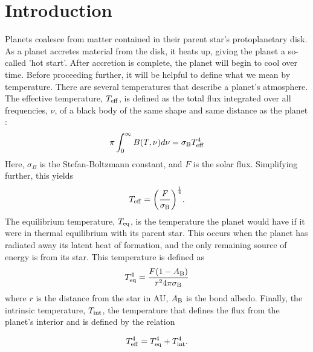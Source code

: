 \documentclass[11pt]{ucscthesisbs}
\begin{document}

\chapter{Introduction}
Planets coalesce from matter contained in their parent star's protoplanetary disk. As a planet accretes material from the disk, it heats up, giving the planet a so-called 'hot start'. After accretion is complete, the planet will begin to cool over time. Before proceeding further, it will be helpful to define what we mean by temperature. There are several temperatures that describe a planet's atmosphere. The effective temperature, $T_{\rm eff}$, is defined as the total flux integrated over all frequencies, $\nu$, of a black body of the same shape and same distance as the planet \citep{seager_2010}:
\begin{equation}
    \pi \int_{0}^{\infty} B(T, \nu) d\nu = \sigma_{\rm B}T_{\rm eff}^{4}
  \label{eq:effective_temp_integral}
\end{equation}  
Here, $\sigma_{B}$ is the Stefan-Boltzmann constant, and $F$ is the solar flux. Simplifying further, this yields
\begin{equation}
    T_{\rm eff} = \bigg(\frac{F}{\sigma_{\rm B}}\bigg)^{\frac{1}{4}}.
  \label{eq:effective_temp}
\end{equation}
The equilibrium temperature, $T_{\rm eq}$, is the temperature the planet would have if it were in thermal equilibrium with its parent star. This occurs when the planet has radiated away its latent heat of formation, and the only remaining source of energy is from its star. This temperature is defined as
\begin{equation}
    T_{\rm eq}^4 = \frac{F(1-A_{\rm B})}{r^{2} 4 \pi \sigma_{\rm B}}
  \label{eq:equilibrium_temp}
\end{equation} 
where $r$ is the distance from the star in AU, $A_{\rm B}$ is the bond albedo. Finally, the intrinsic temperature, $T_{\rm int}$, the temperature that defines the flux from the planet's interior and is defined by the relation

\begin{equation}
    T_{\rm eff}^4 =  T_{\rm eq}^4 +  T_{\rm int}^4.
  \label{eq:effective_temp}
\end{equation} 
\end{document}
